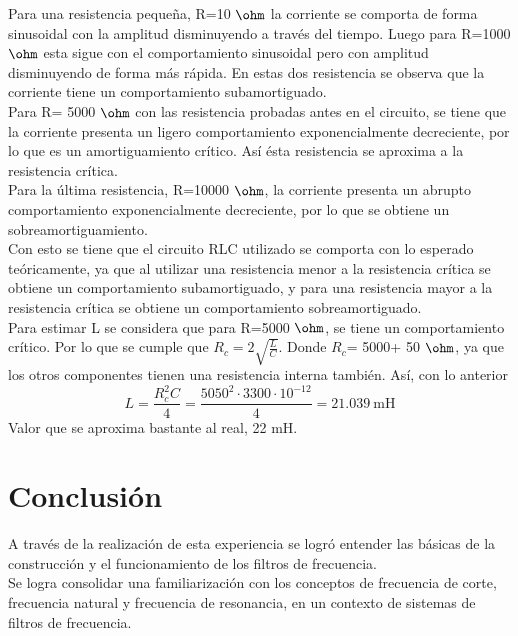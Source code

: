 \documentclass[letterpaper,11pt]{article} %
\begin{document}
Para una resistencia pequeña, R=10 $\ohm$ la corriente se comporta de forma sinusoidal con la amplitud disminuyendo a través del tiempo. Luego para R=1000 $\ohm$ esta sigue con el comportamiento sinusoidal pero con amplitud disminuyendo de forma más rápida. En estas dos resistencia se observa que la corriente tiene un comportamiento subamortiguado.\\

Para R= 5000 $\ohm $ con las resistencia probadas antes en el circuito, se tiene que la corriente presenta un  ligero comportamiento exponencialmente decreciente, por lo que es un amortiguamiento crítico. Así ésta resistencia se aproxima a la resistencia crítica. \\

Para la última resistencia, R=10000 $\ohm $, la corriente presenta un abrupto comportamiento exponencialmente decreciente, por lo que se obtiene un sobreamortiguamiento.\\

Con esto se tiene que el circuito RLC utilizado se comporta con lo esperado teóricamente, ya que al utilizar una resistencia menor a la resistencia crítica se obtiene un comportamiento subamortiguado, y para una resistencia mayor a la resistencia crítica se obtiene un comportamiento sobreamortiguado.\\


Para estimar L se considera que para R=5000 $\ohm $, se tiene un comportamiento crítico. Por lo que se cumple que $R_c=2\sqrt{\frac{L}{C}}$. Donde $R_c$= 5000+ 50 $\ohm$, ya que los otros componentes tienen una resistencia interna también. Así, con lo anterior
$$L=\frac{R_c^2C}{4}=\frac{5050^2\cdot 3300 \cdot10^{-12}}{4}=21.039~ \textrm{mH}$$ Valor que se aproxima bastante al real, 22 mH.




\newpage
\section{Conclusión}

A través de la realización de esta experiencia se logró entender las básicas de la construcción y el funcionamiento de los filtros de frecuencia. \\

Se logra consolidar una familiarización con los conceptos de frecuencia de corte, frecuencia natural y frecuencia de resonancia, en un contexto de sistemas de filtros de frecuencia.\\
\end{document}

